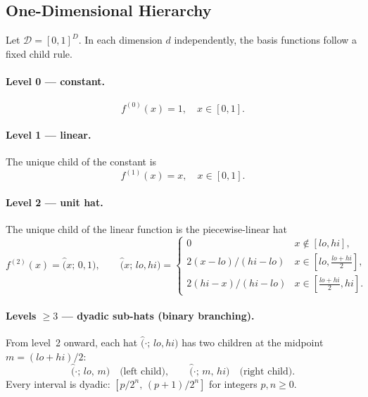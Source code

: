 \documentclass[11pt]{article}
\begin{document}
\subsection{One-Dimensional Hierarchy}
\label{sec:1d-hierarchy}

Let $\mathcal{D} = [0,1]^D$.  In each dimension $d$ independently, the
basis functions follow a fixed child rule.

\paragraph{Level 0 --- constant.}
\begin{equation}
  f^{(0)}(x) = 1, \quad x \in [0,1].
  \label{eq:f0}
\end{equation}

\paragraph{Level 1 --- linear.}
The unique child of the constant is
\begin{equation}
  f^{(1)}(x) = x, \quad x \in [0,1].
  \label{eq:f1}
\end{equation}

\paragraph{Level 2 --- unit hat.}
The unique child of the linear function is the piecewise-linear hat
\begin{equation}
  f^{(2)}(x) = \hat(x;\,0,1), \qquad
  \hat(x;\,lo,hi) =
  \begin{cases}
    0                  & x \notin [lo,hi], \\
    2(x-lo)/(hi-lo)   & x \in [lo,\tfrac{lo+hi}{2}], \\
    2(hi-x)/(hi-lo)   & x \in [\tfrac{lo+hi}{2},hi].
  \end{cases}
  \label{eq:hat1d}
\end{equation}

\paragraph{Levels $\ge 3$ --- dyadic sub-hats (binary branching).}
From level~2 onward, each hat $\hat(\cdot;\,lo,hi)$ has two children at
the midpoint $m = (lo+hi)/2$:
\begin{equation}
  \hat(\cdot;\,lo,\,m) \quad \text{(left child)}, \qquad
  \hat(\cdot;\,m,\,hi) \quad \text{(right child)}.
  \label{eq:hat-children}
\end{equation}
Every interval is dyadic: $[p/2^n,\,(p+1)/2^n]$ for integers $p,n \ge 0$.
\end{document}
